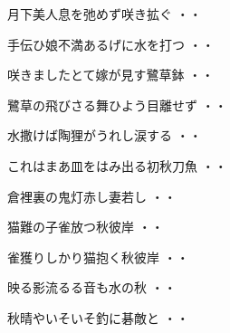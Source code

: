 \vspace{0.6cm}
\begin{shiika}月下美人息を弛めず咲き拡ぐ
\hfill{・・}\end{shiika}
\vspace{0.6cm}
\begin{shiika}手伝ひ娘不満あるげに水を打つ
\hfill{・・}\end{shiika}
\vspace{0.6cm}
\begin{shiika}咲きましたとて嫁が見す鷺草鉢
\hfill{・・}\end{shiika}
\vspace{0.6cm}
\begin{shiika}鷺草の飛びさる舞ひよう目離せず
\hfill{・・}\end{shiika}
\vspace{0.6cm}
\begin{shiika}水撒けば陶狸がうれし涙する
\hfill{・・}\end{shiika}
\vspace{0.6cm}
\begin{shiika}これはまあ皿をはみ出る初秋刀魚
\hfill{・・}\end{shiika}
\vspace{0.6cm}
\begin{shiika}倉裡裏の鬼灯赤し妻若し
\hfill{・・}\end{shiika}
\vspace{0.6cm}
\begin{shiika}猫難の子雀放つ秋彼岸
\hfill{・・}\end{shiika}
\vspace{0.6cm}
\begin{shiika}雀獲りしかり猫抱く秋彼岸
\hfill{・・}\end{shiika}
\vspace{0.6cm}
\begin{shiika}映る影流るる音も水の秋
\hfill{・・}\end{shiika}
\vspace{0.6cm}
\begin{shiika}秋晴やいそいそ釣に碁敵と
\hfill{・・}\end{shiika}
